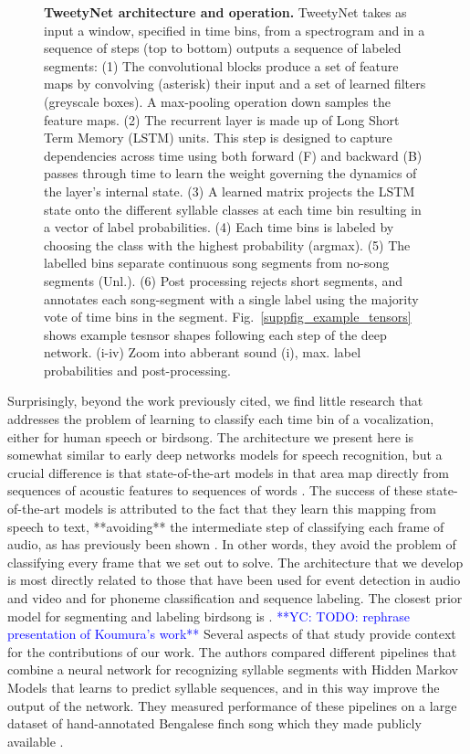 \documentclass[10pt,letterpaper]{article}
\begin{document}
\begin{figure}[!ht]
{\caption{{\bf TweetyNet architecture and operation.}
TweetyNet takes as input a window, 
specified in time bins, from a spectrogram and in a sequence of steps (top to bottom) outputs a sequence of labeled segments:
(1) The convolutional blocks produce a set of feature maps 
by convolving (asterisk) their input and a set of learned filters (greyscale boxes). 
A max-pooling operation down samples the feature maps.
(2) The recurrent layer is made up of Long Short Term Memory (LSTM) units. 
This step is designed to capture dependencies across time 
using both forward (F) and backward (B) passes through time to learn the weight governing the dynamics of the layer's internal state. 
(3) A learned matrix projects the LSTM state onto the different syllable classes at each time bin 
resulting in a vector of label probabilities.
(4) Each time bins is labeled by choosing the class with the highest probability (argmax).
(5) The labelled bins separate continuous song segments from no-song segments (Unl.).  
(6) Post processing rejects short segments, and annotates each song-segment with a single label using the majority vote of time bins in the segment. Fig.~\ref{suppfig_example_tensors} shows example tesnsor shapes following each step of the deep network.
(i-iv) Zoom into abberant sound (i), max. label probabilities and post-processing.}
\label{fig_tweetynet_architecture}}
\end{figure}

Surprisingly, beyond the work previously cited, we find little research that addresses the problem of learning to classify each time bin of a vocalization, either for human speech or birdsong.
The architecture we present here is somewhat similar to early deep networks models for speech recognition, 
but a crucial difference is that state-of-the-art models in that area 
map directly from sequences of acoustic features to sequences of words \cite{graves2006connectionist}.
The success of these state-of-the-art models is attributed to the fact that they learn this mapping from speech to text, **avoiding** the intermediate step of classifying each frame of audio, as has previously been shown \cite{graves_supervised_2012}.
In other words, they avoid the problem of classifying every frame that we set out to solve.
The architecture that we develop is most directly related to those that have been used for event 
detection in audio and video \cite{bock_polyphonic_2012-1,parascandolo_recurrent_2016} 
and for phoneme classification and sequence labeling\cite{graves_framewise_2005,graves_supervised_2012}.
The closest prior model for segmenting and labeling birdsong is \cite{koumura_automatic_2016-1}. 
\textcolor{blue}{**YC: TODO: rephrase presentation of Koumura's work**} Several aspects of that study provide context for the contributions of our work. 
The authors compared different pipelines that combine a neural network for recognizing syllable 
segments with Hidden Markov Models that learns to predict syllable sequences, and in this way 
improve the output of the network. They measured performance of these pipelines on a large dataset of 
hand-annotated Bengalese finch song which they made publicly available \cite{koumura_birdsongrecognition_2016}.
\end{document}

